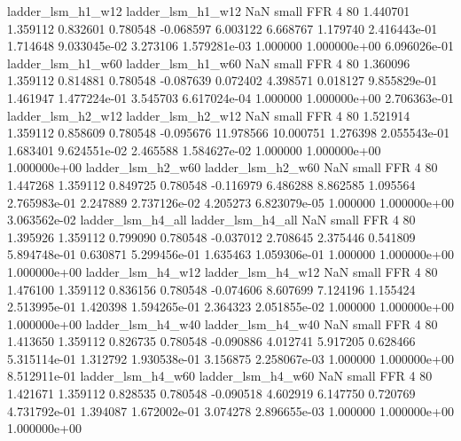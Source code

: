        ladder_lsm_h1_w12        ladder_lsm_h1_w12                   NaN      small      FFR                 4 80 1.440701       1.359112 0.832601       0.780548   -0.068597      6.003122      6.668767     1.179740   2.416443e-01  1.714648 9.033045e-02     3.273106   1.579281e-03            1.000000    1.000000e+00        6.096026e-01
       ladder_lsm_h1_w60        ladder_lsm_h1_w60                   NaN      small      FFR                 4 80 1.360096       1.359112 0.814881       0.780548   -0.087639      0.072402      4.398571     0.018127   9.855829e-01  1.461947 1.477224e-01     3.545703   6.617024e-04            1.000000    1.000000e+00        2.706363e-01
       ladder_lsm_h2_w12        ladder_lsm_h2_w12                   NaN      small      FFR                 4 80 1.521914       1.359112 0.858609       0.780548   -0.095676     11.978566     10.000751     1.276398   2.055543e-01  1.683401 9.624551e-02     2.465588   1.584627e-02            1.000000    1.000000e+00        1.000000e+00
       ladder_lsm_h2_w60        ladder_lsm_h2_w60                   NaN      small      FFR                 4 80 1.447268       1.359112 0.849725       0.780548   -0.116979      6.486288      8.862585     1.095564   2.765983e-01  2.247889 2.737126e-02     4.205273   6.823079e-05            1.000000    1.000000e+00        3.063562e-02
       ladder_lsm_h4_all        ladder_lsm_h4_all                   NaN      small      FFR                 4 80 1.395926       1.359112 0.799090       0.780548   -0.037012      2.708645      2.375446     0.541809   5.894748e-01  0.630871 5.299456e-01     1.635463   1.059306e-01            1.000000    1.000000e+00        1.000000e+00
       ladder_lsm_h4_w12        ladder_lsm_h4_w12                   NaN      small      FFR                 4 80 1.476100       1.359112 0.836156       0.780548   -0.074606      8.607699      7.124196     1.155424   2.513995e-01  1.420398 1.594265e-01     2.364323   2.051855e-02            1.000000    1.000000e+00        1.000000e+00
       ladder_lsm_h4_w40        ladder_lsm_h4_w40                   NaN      small      FFR                 4 80 1.413650       1.359112 0.826735       0.780548   -0.090886      4.012741      5.917205     0.628466   5.315114e-01  1.312792 1.930538e-01     3.156875   2.258067e-03            1.000000    1.000000e+00        8.512911e-01
       ladder_lsm_h4_w60        ladder_lsm_h4_w60                   NaN      small      FFR                 4 80 1.421671       1.359112 0.828535       0.780548   -0.090518      4.602919      6.147750     0.720769   4.731792e-01  1.394087 1.672002e-01     3.074278   2.896655e-03            1.000000    1.000000e+00        1.000000e+00

